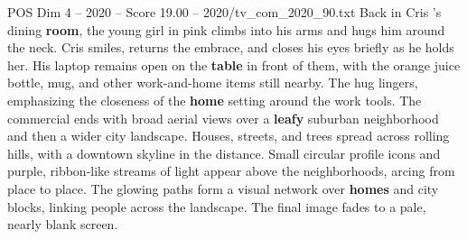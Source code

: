\begin{textsample}{POS Dim 4 – 2020 – Score 19.00 – 2020/tv\_com\_2020\_90.txt}
Back in Cris ’s dining \textbf{room}, the young girl in pink climbs into his arms and hugs him around the neck.
Cris smiles, returns the embrace, and closes his eyes briefly as he holds her.
His laptop remains open on the \textbf{table} in front of them, with the orange juice bottle, mug, and other work-and-home items still nearby.
The hug lingers, emphasizing the closeness of the \textbf{home} setting around the work tools.
The commercial ends with broad aerial views over a \textbf{leafy} suburban neighborhood and then a wider city landscape.
Houses, streets, and trees spread across rolling hills, with a downtown skyline in the distance.
Small circular profile icons and purple, ribbon-like streams of light appear above the neighborhoods, arcing from place to place.
The glowing paths form a visual network over \textbf{homes} and city blocks, linking people across the landscape.
The final image fades to a pale, nearly blank screen.

\end{textsample}
